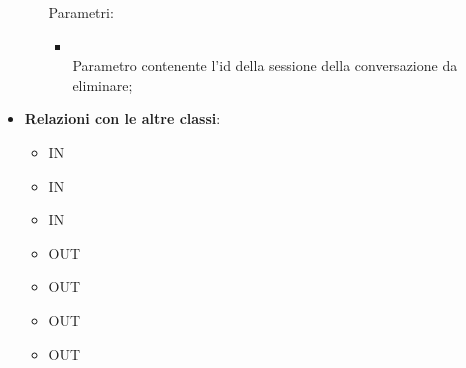\begin{itemize}
\begin{itemize}
		Parametri:
		\begin{itemize}
			\item {} \\
			Parametro contenente l'id della sessione della conversazione da eliminare;
		\end{itemize}
	\end{itemize}
	\item \textbf{Relazioni con le altre classi}:
	\begin{itemize}
		\item IN \hyperlink{ConversationWebhookService_label}{}
		\item IN \hyperlink{VAMessageListener_label}{}
		\item IN \hyperlink{ConversationsDAODynamoDB_label}{}
		\item OUT \hyperlink{ConversationMsg_label}{}
		\item OUT \hyperlink{ConversationObservable_label}{}
		\item OUT \hyperlink{Conversation_label}{}
		\item OUT \hyperlink{ErrorObservable_label}{}
	\end{itemize}
\end{itemize}
\FloatBarrier

